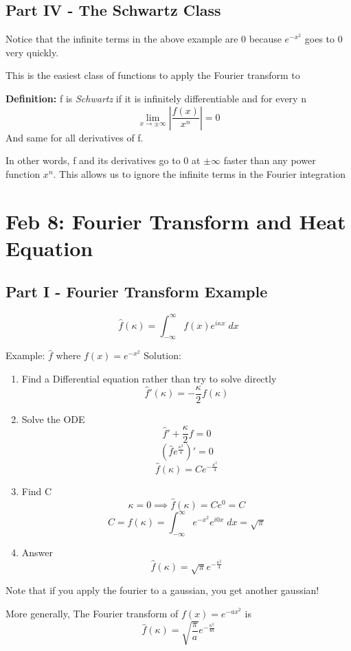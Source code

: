 \documentclass[12pt]{article}
\newcommand{\ans}[1]{\boxed{\text{#1}}}
\renewcommand{\hat}[1]{\widehat{#1}}
\begin{document}
\subsection*{Part IV - The Schwartz Class}
Notice that the infinite terms in the above example are 0 because $e^{-x^2}$ goes to 0 very quickly. 

This is the easiest class of functions to apply the Fourier transform to 

\textbf{Definition:} f is \emph{Schwartz} if it is infinitely differentiable and for every n 
\[\lim_{x\to \pm \infty} \left|\frac{f(x)}{x^n}\right| = 0\]
And same for all derivatives of f.

In other words, f and its derivatives go to 0 at $\pm \infty$ faster than any power function $x^n$. This allows us to ignore the infinite terms in the Fourier integration

\section{Feb 8: Fourier Transform and Heat Equation}
\subsection*{Part I - Fourier Transform Example}
\[\hat{f}(\kappa) = \int_{-\infty}^\infty f(x) e^{i \kappa x}\; dx \]

Example: $\hat{f}$ where $f(x) = e^{-x^2}$
Solution: 
\begin{enumerate}
    \item Find a Differential equation rather than try to solve directly
    \[\hat{f}'(\kappa) = -\frac{\kappa}{2} f(\kappa)\]
    \item Solve the ODE 
    \[\hat{f}' + \frac{\kappa}{2}f = 0\]
    \[\left(\hat{f}e^{\frac{\kappa^2}{4}}\right)' = 0\]
    \[\hat{f}(\kappa) = Ce^{-\frac{\kappa^2}{4}}\]
    \item Find C
    \[\kappa = 0 \implies \hat{f}(\kappa) = Ce^0 = C\]
    \[C = \hat{f}(\kappa) = \int_{-\infty}^{\infty}e^{-x^2}e^{i0x} \; dx = \sqrt{\pi} \]
    \item Answer 
    \[\ans{$\hat{f}(\kappa) = \sqrt{\pi} e^{-\frac{\kappa^2}{4}}$}\]
\end{enumerate} 

Note that if you apply the fourier to a gaussian, you get another gaussian! 

More generally, 
The Fourier transform of $f(x) = e^{-ax^2}$ is
\[\ans{$\hat{f}(\kappa) = \sqrt{\frac{\pi}{a}}e^{-\frac{\kappa^2}{4a}}$}\]
\end{document}
